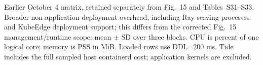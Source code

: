 \begin{table}[htbp]
\centering\small
\caption{Earlier October 4 matrix, retained separately from Fig.~15 and Tables~S31--S33. Broader non-application deployment overhead, including Ray serving processes and KubeEdge deployment support; this differs from the corrected Fig.~15 management/runtime scope: mean $\pm$ SD over three blocks. CPU is percent of one logical core; memory is PSS in MiB. Loaded rows use DDL=200 ms. Tide includes the full sampled host containerd cost; application kernels are excluded.}
\label{tab:control-resources}

\end{table}
